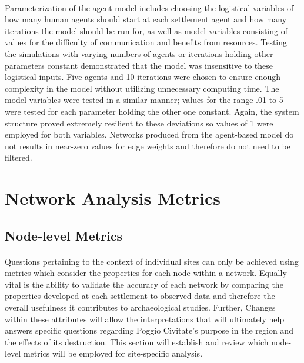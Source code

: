 \documentclass[12pt,a4paper]{thesis}
\begin{document}
\paragraph{}
Parameterization of the agent model includes choosing the logistical variables of how many human agents should start at each settlement agent and how many iterations the model should be run for, as well as model variables consisting of values for the difficulty of communication and benefits from resources. Testing the simulations with varying numbers of agents or iterations holding other parameters constant demonstrated that the model was insensitive to these logistical inputs. Five agents and 10 iterations were chosen to ensure enough complexity in the model without utilizing unnecessary computing time. The model variables were tested in a similar manner; values for the range .01 to 5 were tested for each parameter holding the other one constant. Again, the system structure proved extremely resilient to these deviations so values of 1 were employed for both variables. Networks produced from the agent-based model do not results in near-zero values for edge weights and therefore do not need to be filtered.   

\section{Network Analysis Metrics}

\subsection{Node-level Metrics}

\paragraph{}
Questions pertaining to the context of individual  sites can only be achieved using metrics which consider the properties for each node within a network. Equally vital is the ability to validate the accuracy of each network by comparing the properties developed at each settlement to observed data and therefore the overall usefulness it contributes to archaeological studies. Further, Changes within these attributes will allow the interpretations that will ultimately help answers specific questions regarding Poggio Civitate's purpose in the region and the effects of its destruction. This section will establish and review which node-level metrics will be employed for site-specific analysis.
\end{document}
